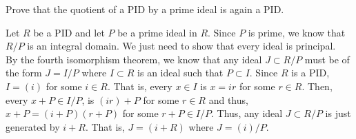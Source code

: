 \documentclass[12 pt, letterpaper]{hmcpset}
\begin{document}
\pagebreak

\begin{problem}
	Prove that the quotient of a PID by a prime ideal is again a PID.
\end{problem}

\begin{solution}
	Let $R$ be a PID and let $P$ be a prime ideal in $R$. Since $P$ is prime, we know that $R/P$ is an integral domain. We just need to show that every ideal is principal. \\
	
	By the fourth isomorphism theorem, we know that any ideal $J \subset R/P$ must be of the form $J = I/P$ where $I \subset R$ is an ideal such that $P \subset I$. Since $R$ is a PID, $I = (i)$ for some $i \in R$. That is, every $x \in I$ is $x = ir$ for some $r \in R$. Then, every $x + P \in I/P$, is $(ir) + P$ for some $r \in R$ and thus, $x + P = (i + P)(r + P)$ for some $r + P \in I/P$. Thus, any ideal $J \subset R/P$ is just generated by $i + R$. That is, $J = (i + R)$ where $J = (i)/P$.
\end{solution}
\end{document}
